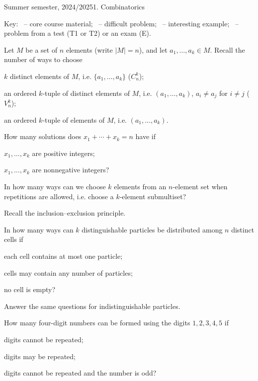 \documentclass[a4paper]{report}
\begin{document}
\noindent Summer semester, 2024/2025\hfill 1. Combinatorics
\par\noindent\hrulefill\par
\begin{it}
Key: \faBook\ -- core course material; \faStar\ -- difficult problem;
\faSmile[regular]\ -- interesting example; \faPencil*\ -- problem from a test (T1 or T2) or an exam (E).
\end{it}
\begin{problembook}
Let $M$ be a set of $n$ elements (write $|M|=n$), and let $a_1,\dots,a_k\in M$. Recall the number of ways to choose
\begin{enumeratea}
\item $k$ distinct elements of $M$, i.e. $\{a_1,\dots,a_k\}$ ($C_n^k$);
\item an ordered $k$-tuple of distinct elements of $M$, i.e. $(a_1,\dots,a_k)$, $a_i\ne a_j$ for $i\ne j$ ($V_n^k$);
\item an ordered $k$-tuple of elements of $M$, i.e. $(a_1,\dots,a_k)$.
\end{enumeratea}
\end{problembook}
\begin{problembook}
How many solutions does $x_1+\cdots+x_k=n$ have if
\begin{enumeratea}
\item $x_1,\dots,x_k$ are positive integers;
\item $x_1,\dots,x_k$ are nonnegative integers?
\end{enumeratea}
In how many ways can we choose $k$ elements from an $n$-element set when repetitions are allowed, i.e. choose a $k$-element submultiset?
\end{problembook}
\begin{problembook}Recall the inclusion--exclusion principle.\end{problembook}
\begin{problem}
In how many ways can $k$ distinguishable particles be distributed among $n$ distinct cells if
\begin{enumeratea}
\item each cell contains at most one particle;
\item cells may contain any number of particles;
\item no cell is empty?
\end{enumeratea}
Answer the same questions for indistinguishable particles.
\end{problem}
\begin{problem}
How many four-digit numbers can be formed using the digits $1,2,3,4,5$ if
\begin{enumeratea}
\item digits cannot be repeated;
\item digits may be repeated;
\item digits cannot be repeated and the number is odd?
\end{enumeratea}
\end{problem}
\end{document}
